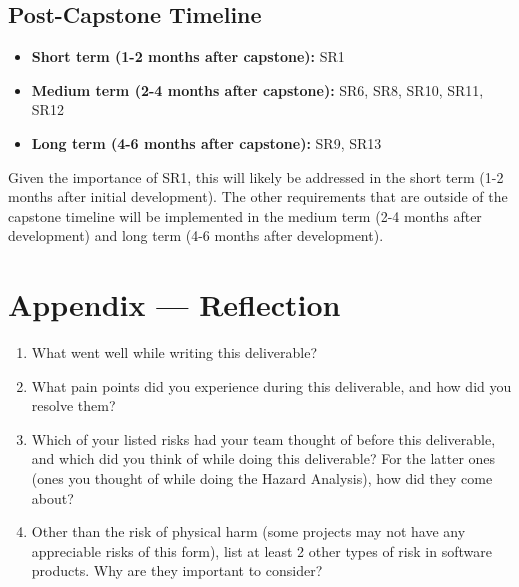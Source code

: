 \documentclass{article}
\begin{document}
\subsection*{Post-Capstone Timeline}

\begin{itemize}
    \item \textbf{Short term (1-2 months after capstone):} SR1
    \item \textbf{Medium term (2-4 months after capstone):} SR6, SR8, SR10, SR11, SR12
    \item \textbf{Long term (4-6 months after capstone):} SR9, SR13
\end{itemize}

Given the importance of SR1, this will likely be addressed in the short term (1-2 months after initial development). The other requirements that are outside of the capstone timeline will be implemented in the medium term (2-4 months after development) and long term (4-6 months after development).

\newpage{}

\section*{Appendix --- Reflection}




\begin{enumerate}
    \item What went well while writing this deliverable? 
    \item What pain points did you experience during this deliverable, and how
    did you resolve them?
    \item Which of your listed risks had your team thought of before this
    deliverable, and which did you think of while doing this deliverable? For
    the latter ones (ones you thought of while doing the Hazard Analysis), how
    did they come about?
    \item Other than the risk of physical harm (some projects may not have any
    appreciable risks of this form), list at least 2 other types of risk in
    software products. Why are they important to consider?
\end{enumerate}
\end{document}
